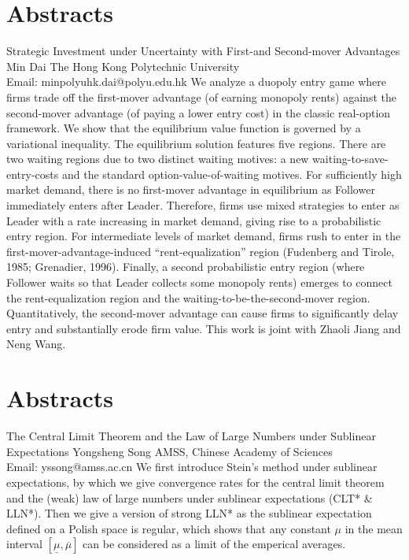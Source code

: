 \documentclass[
	openany, %
	parskip=full, %
	12pt, %
	a4paper, %
]{conferencebooklet} %
\begin{document}
\chapter*{Abstracts}
\abstract
    {Strategic Investment under Uncertainty with First-and Second-mover Advantages}
    {Min Dai}
    {}
    {The Hong Kong Polytechnic University\\
    Email: minpolyuhk.dai@polyu.edu.hk}
    {We analyze a duopoly entry game where firms trade off the first-mover advantage (of earning monopoly rents) against the second-mover advantage (of paying a lower entry cost) in the classic real-option framework. We show that the equilibrium value function is governed by a variational inequality. The equilibrium solution features five regions. There are two waiting regions due to two distinct waiting motives: a new waiting-to-save-entry-costs and the standard option-value-of-waiting motives. For sufficiently high market demand, there is no first-mover advantage in equilibrium as Follower immediately enters after Leader. Therefore, firms use mixed strategies to enter as Leader with a rate increasing in market demand, giving rise to a probabilistic entry region. For intermediate levels of market demand, firms rush to enter in the first-mover-advantage-induced “rent-equalization” region (Fudenberg and Tirole, 1985; Grenadier, 1996). Finally, a second probabilistic entry region (where Follower waits so that Leader collects some monopoly rents) emerges to connect the rent-equalization region and the waiting-to-be-the-second-mover region. Quantitatively, the second-mover advantage can cause firms to significantly delay entry and substantially erode firm value. This work is joint with Zhaoli Jiang and Neng Wang.}


\chapter*{Abstracts}
\abstract
    {The Central Limit Theorem and the Law of Large Numbers
    under Sublinear Expectations}
    {Yongsheng Song}
    {}
    {AMSS, Chinese Academy of Sciences\\
    Email: yssong@amss.ac.cn}
    {We first introduce Stein's method under sublinear expectations, by which we give convergence rates for the central limit theorem and the (weak) law of large numbers under sublinear expectations (CLT* \& LLN*). Then we give a version of strong LLN*  as the sublinear expectation defined on a Polish space is regular, which shows that any constant $\mu$ in the mean interval $[\underline{\mu},\overline{\mu}]$ can be considered as a limit of the emperical averages.}
\end{document}
